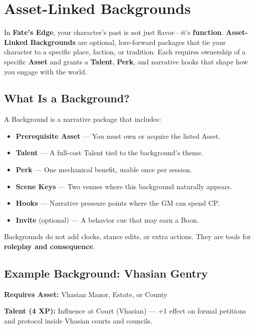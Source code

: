 
\chapter{Asset-Linked Backgrounds}

In \textbf{Fate’s Edge}, your character’s past is not just flavor—it’s \textbf{function}. \textbf{Asset-Linked Backgrounds} are optional, lore-forward packages that tie your character to a specific place, faction, or tradition. Each requires ownership of a specific \textbf{Asset} and grants a \textbf{Talent}, \textbf{Perk}, and narrative hooks that shape how you engage with the world.

\section{What Is a Background?}

A Background is a narrative package that includes:

\begin{itemize}
  \item \textbf{Prerequisite Asset} — You must own or acquire the listed Asset.
  \item \textbf{Talent} — A full-cost Talent tied to the background's theme.
  \item \textbf{Perk} — One mechanical benefit, usable once per session.
  \item \textbf{Scene Keys} — Two venues where this background naturally appears.
  \item \textbf{Hooks} — Narrative pressure points where the GM can spend CP.
  \item \textbf{Invite} (optional) — A behavior cue that may earn a Boon.
\end{itemize}

Backgrounds do not add clocks, stance edits, or extra actions. They are tools for \textbf{roleplay and consequence}.

\section{Example Background: Vhasian Gentry}

\textbf{Requires Asset:} Vhasian Manor, Estate, or County

\textbf{Talent (4 XP):} Influence at Court (Vhasian) — +1 effect on formal petitions and protocol inside Vhasian courts and councils.

